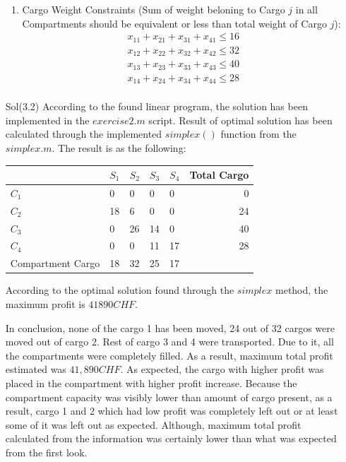 \documentclass[unicode,11pt,a4paper,oneside,numbers=endperiod,openany]{scrartcl}
\begin{document}
\begin{enumerate}
\begin{enumerate}
  \item Cargo Weight Constraints (Sum of weight beloning to Cargo ${j}$ in all Compartments should be equivalent or less than total weight of Cargo ${j}$):
 \begin{equation*}
  \begin{aligned}
   x_{11} + x_{21} + x_{31} + x_{41} \leq 16 \\
   x_{12} + x_{22} + x_{32} + x_{42} \leq 32 \\
   x_{13} + x_{23} + x_{33} + x_{43} \leq 40 \\
   x_{14} + x_{24} + x_{34} + x_{44} \leq 28 \\
  \end{aligned}
 \end{equation*}

\end{enumerate}

\item[Sol(3.2)] According to the found linear program, the solution has been implemented in the ${exercise2.m}$ script. Result of optimal solution has been calculated through the implemented ${simplex()}$ function from the ${simplex.m}$. The result is as the following: \\

\begin{center}
\begin{tabular}{l|l|l|l|l|r}
 & ${S_1}$ & ${S_2}$ & ${S_3}$ & ${S_4}$ & Total Cargo \\
 \hline
 ${C_1}$ & 0 & 0 & 0 & 0 & 0 \\
  \hline
 ${C_2}$ & 18 & 6 & 0 & 0 & 24 \\
  \hline
 ${C_3}$ & 0 & 26 & 14 & 0 & 40 \\
  \hline
 ${C_4}$ & 0 & 0 & 11 & 17 & 28 \\
  \hline
 Compartment Cargo & 18 & 32 & 25 & 17 & \\
\end{tabular}
\end{center}

According to the optimal solution found through the ${simplex}$ method, the maximum profit is ${41890 CHF}$.

In conclusion, none of the cargo 1 has been moved, 24 out of 32 cargos were moved out of cargo 2. Rest of cargo 3 and 4 were transported. Due to it, all the compartments were completely filled. As a result, maximum total profit estimated was ${41,890 CHF}$. As expected, the cargo with higher profit was placed in the compartment with higher profit increase. Because the compartment capacity was visibly lower than amount of cargo present, as a result, cargo 1 and 2 which had low profit was completely left out or at least some of it was left out as expected. Although, maximum total profit calculated from the information was certainly lower than what was expected from the first look.  
\end{enumerate}
\end{document}
